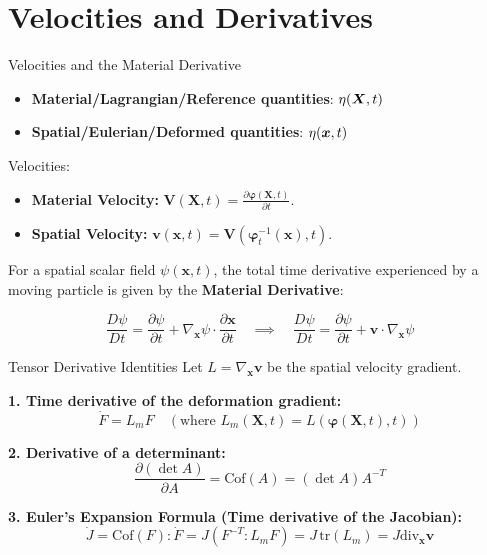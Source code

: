 \documentclass[aspectratio=169]{beamer}
\renewcommand{\vec}{\vectorsym}
\begin{document}
\section{Velocities and Derivatives}

\begin{frame}{Velocities and the Material Derivative}
    \begin{itemize}
        \item \textbf{Material/Lagrangian/Reference quantities}: $\eta(\vec X, t)$
        \item \textbf{Spatial/Eulerian/Deformed quantities}: $\eta(\vec x, t)$
    \end{itemize}

    \pause Velocities:
    \begin{itemize}
        \item \textbf{Material Velocity:} $\bm{V}(\bm{X}, t) = \frac{\partial \bm{\varphi}(\bm{X}, t)}{\partial t}$.
        \item \textbf{Spatial Velocity:} $\bm{v}(\bm{x}, t) = \bm{V}(\bm{\varphi}_t^{-1}(\bm{x}),t)$.
    \end{itemize}

    For a spatial scalar field $\psi(\bm{x}, t)$, the total time derivative experienced by a moving particle is given by the \textbf{Material Derivative}:

    $$ \frac{D\psi}{Dt} = \frac{\partial \psi}{\partial t} + \nabla_{\bm{x}} \psi \cdot \frac{\partial \bm{x}}{\partial t} \quad \implies \quad \frac{D\psi}{Dt} = \frac{\partial \psi}{\partial t} + \bm{v} \cdot \nabla_{\bm{x}} \psi $$

\end{frame}

\begin{frame}{Tensor Derivative Identities}
    Let $L = \nabla_{\bm{x}} \bm{v}$ be the spatial velocity gradient.

    \vspace{0.3cm}
    \textbf{1. Time derivative of the deformation gradient:}
    $$ \dot{F} = L_m F \quad (\text{where } L_m(\bm{X},t) = L(\bm{\varphi}(\bm{X},t), t)) $$

    \textbf{2. Derivative of a determinant:}
    $$ \frac{\partial(\det A)}{\partial A} = \text{Cof}(A) = (\det A) A^{-T} $$

    \textbf{3. Euler's Expansion Formula (Time derivative of the Jacobian):}
    $$ \dot{J} = \text{Cof}(F) : \dot{F} = J (F^{-T} : L_m F) = J \, \text{tr}(L_m) = J \text{div}_{\bm{x}} \bm{v} $$
\end{frame}
\end{document}

